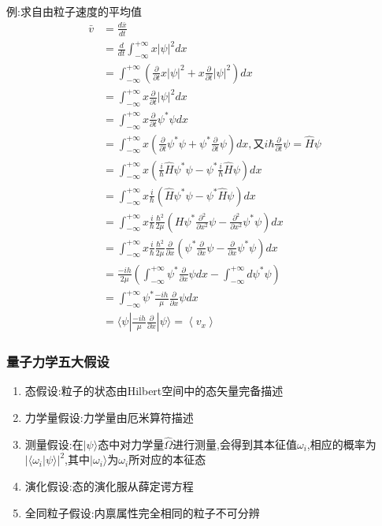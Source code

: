 \documentclass[lang=cn,15pt]{elegantbook}
\begin{document}
 例:求自由粒子速度的平均值
 \begin{equation*}
 	\begin{split}
 		\bar{v}&=\frac{d\bar{x}}{dt}
 		\\
 		&=\frac{d}{dt}\int_{-\infty}^{+\infty}{x|\psi |^2}dx
 		\\
 		&=\int_{-\infty}^{+\infty}{\left( \frac{\partial}{\partial t}x|\psi |^2+x\frac{\partial}{\partial t}|\psi |^2 \right)}dx
 		\\
 		&=\int_{-\infty}^{+\infty}{x\frac{\partial}{\partial t}|\psi |^2}dx
 		\\
 		&=\int_{-\infty}^{+\infty}{x\frac{\partial}{\partial t}\psi ^*\psi}dx
 		\\
 		&=\int_{-\infty}^{+\infty}{x\left( \frac{\partial}{\partial t}\psi ^*\psi +\psi ^*\frac{\partial}{\partial t}\psi \right)}dx,\text{又}i\hbar \frac{\partial}{\partial t}\psi =\hat{H}\psi 
 		\\
 		&=\int_{-\infty}^{+\infty}{x\left( \frac{i}{\hbar}\hat{H}\psi ^*\psi -\psi ^*\frac{i}{\hbar}\hat{H}\psi \right)}dx
 		\\
 		&=\int_{-\infty}^{+\infty}{x\frac{i}{\hbar}\left( \hat{H}\psi ^*\psi -\psi ^*\hat{H}\psi \right)}dx
 		\\
 		&=\int_{-\infty}^{+\infty}{x\frac{i}{\hbar}\frac{\hbar ^2}{2\mu}\left( H\psi ^*\frac{\partial ^2}{\partial x^2}\psi -\frac{\partial ^2}{\partial x^2}\psi ^*\psi \right)}dx
 		\\
 		&=\int_{-\infty}^{+\infty}{x\frac{i}{\hbar}\frac{\hbar ^2}{2\mu}\frac{\partial}{\partial x}\left( \psi ^*\frac{\partial}{\partial x}\psi -\frac{\partial}{\partial x}\psi ^*\psi \right)}dx
 		\\
 		&=\frac{-ih}{2\mu}\left( \int_{-\infty}^{+\infty}{\psi ^*\frac{\partial}{\partial x}\psi dx-\int_{-\infty}^{+\infty}{d\psi ^*\psi}} \right) 
 		\\
 		&=\int_{-\infty}^{+\infty}{\psi ^*\frac{-ih}{\mu}\frac{\partial}{\partial x}\psi}dx
 		\\
 		&=\langle \psi |\frac{-ih}{\mu}\frac{\partial}{\partial x}|\psi \rangle =\left< v_x \right> 
 	\end{split}
 \end{equation*}
 
 \subsubsection{量子力学五大假设}
 \begin{enumerate}
 	\item 态假设:粒子的状态由Hilbert空间中的态矢量完备描述
 	\item 力学量假设:力学量由厄米算符描述
 	\item 测量假设:在$|\psi\rangle$态中对力学量$\hat{\Omega}$进行测量,会得到其本征值$\omega_i$,相应的概率为$ |\langle\omega_i|\psi\rangle|^2$,其中$|\omega_i\rangle$为$\omega_i$所对应的本征态
 	\item 演化假设:态的演化服从薛定谔方程
 	\item 全同粒子假设:内禀属性完全相同的粒子不可分辨
 	
 \end{enumerate}
\end{document}
